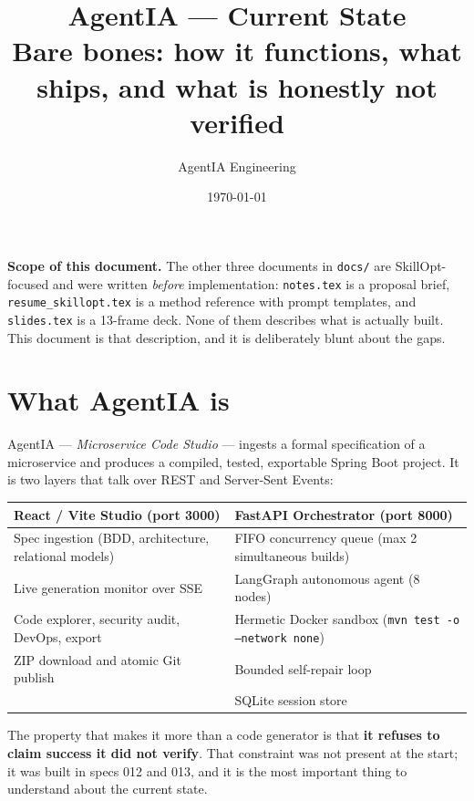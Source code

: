 \documentclass[11pt,a4paper]{article}
\title{\vspace{-1.4cm}\textbf{AgentIA --- Current State}\\[0.25cm]
\large Bare bones: how it functions, what ships, and what is honestly not verified}
\author{AgentIA Engineering}
\date{\today}
\begin{document}
\maketitle
\thispagestyle{fancy}

\begin{notebox}
\textbf{Scope of this document.} The other three documents in \texttt{docs/} are
SkillOpt-focused and were written \emph{before} implementation:
\texttt{notes.tex} is a proposal brief, \texttt{resume\_skillopt.tex} is a method
reference with prompt templates, and \texttt{slides.tex} is a 13-frame deck. None
of them describes what is actually built. This document is that description, and it
is deliberately blunt about the gaps.
\end{notebox}

\tableofcontents
\vspace{0.6cm}

\section{What AgentIA is}

AgentIA --- \emph{Microservice Code Studio} --- ingests a formal specification of a
microservice and produces a compiled, tested, exportable Spring Boot project. It is
two layers that talk over REST and Server-Sent Events:

\begin{center}
\begin{tabular}{@{}p{}p{}@{}}
\toprule
\textbf{React / Vite Studio (port 3000)} & \textbf{FastAPI Orchestrator (port 8000)} \\
\midrule
Spec ingestion (BDD, architecture, relational models) &
FIFO concurrency queue (max 2 simultaneous builds) \\
Live generation monitor over SSE &
LangGraph autonomous agent (8 nodes) \\
Code explorer, security audit, DevOps, export &
Hermetic Docker sandbox (\texttt{mvn test -o --network none}) \\
ZIP download and atomic Git publish &
Bounded self-repair loop \\
& SQLite session store \\
\bottomrule
\end{tabular}
\end{center}

The property that makes it more than a code generator is that \textbf{it refuses to
claim success it did not verify}. That constraint was not present at the start; it
was built in specs 012 and 013, and it is the most important thing to understand
about the current state.
\end{document}
